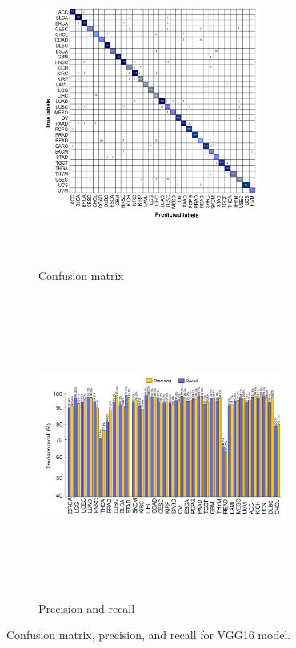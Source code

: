 \begin{figure}
	\centering
	\begin{subfigure}{.48\linewidth}
		\centering
		\includegraphics[width=0.8\textwidth,height=100mm]{images/conf_uni_modal.png}
		\caption{Confusion matrix}
        \label{fig:conf_cnn}
	\end{subfigure}
	\hspace{-4mm}
	\begin{subfigure}{0.48\linewidth}
		\centering
		\includegraphics[width=0.9\textwidth,height=100mm]{images/pvr_value.png}
		\caption{Precision and recall}
        \label{fig:pr_vgg16}
	\end{subfigure}
	\caption{Confusion matrix, precision, and recall for VGG16 model.} 
	\label{fig:conf_precision_recall_vgg16}
	\vspace{-4mm}
\end{figure}

